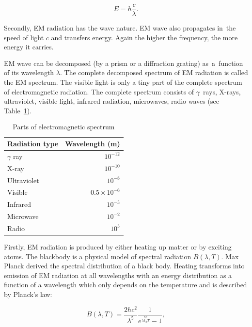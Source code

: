 \begin{equation}
	E = h \frac{c}{\lambda}.
	\label{energy_wavelength}
\end{equation}


Secondly, EM radiation has the wave nature. 
EM wave also propagates in~the speed of light \(c\) and transfers energy.
Again the higher the frequency, the more energy it carries.~\cite{cochard2018}

EM wave can be decomposed (by a prism or a diffraction grating) as~a~function of its wavelength \(\lambda\).
The complete decomposed spectrum of EM radiation is called the EM spectrum.
The visible light is only a tiny part of the complete spectrum of electromagnetic radiation.
The complete spectrum consists of \(\gamma\)~rays, X-rays, ultraviolet, visible light, infrared radiation, microwaves, radio waves (see Table~\ref{em_spectrum}).

\begin{table}
\begin{center}
\begin{tabular}{|l|r|}
	\hline
	Radiation type & Wavelength (m) \\ \hline \hline
	\(\gamma\) ray & \(10^{-12}\) \\ \hline
	X-ray & \(10^{-10}\) \\ \hline
	Ultraviolet & \(10^{-8}\) \\ \hline
	Visible & \(0.5 \times 10^{-6}\) \\ \hline
	Infrared & \(10^{-5}\) \\ \hline
	Microwave & \(10^{-2}\) \\ \hline
	Radio & \(10^{3}\) \\ \hline
\end{tabular}
\end{center}
\caption{Parts of electromagnetic spectrum}
\label{em_spectrum}
\end{table}

Firstly, EM radiation is produced by either heating up matter or by exciting atoms.
The blackbody is a physical model of spectral radiation \(B(\lambda, T)\).
Max Planck derived the spectral distribution of a black body.
Heating transforms into emission of EM radiation at all wavelengths
with an energy distribution as a function of a wavelength
which only depends on the temperature and is described by Planck's law:

\begin{equation}
	B(\lambda, T) = \frac{2 h c^2}{\lambda^5}
	\frac{1}{e^{\frac{hc}{\lambda k_{\mathrm{B}}T}} - 1},
\end{equation}

